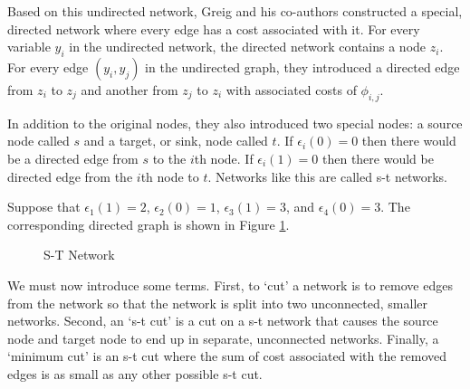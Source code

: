 Based on this undirected network, Greig and his co-authors constructed
a special, directed network where every edge has a cost associated
with it. For every variable $y_i$ in the undirected network, the
directed network contains a node $z_i$.  For every edge $(y_i, y_j)$ in the
undirected graph, they introduced a directed edge from $z_i$ to $z_j$ and
another from $z_j$ to $z_i$ with associated costs of $\phi_{i,j}$.

In addition to the original nodes, they also introduced two special
nodes: a source node called $s$ and a target, or sink, node called
$t$. If $\epsilon_i(0) = 0$ then there would be a directed edge from
$s$ to the $i$th node. If $\epsilon_i(1) = 0$ then there would be
directed edge from the $i$th node to $t$. Networks like this are
called s-t networks.

Suppose that $\epsilon_1(1)=2$, $\epsilon_2(0)=1$, $\epsilon_3(1)=3$,
and $\epsilon_4(0)=3$. The corresponding directed graph is shown in
Figure \ref{fig:directed}. 

\begin{figure}[!h]
\centering

\caption{S-T Network}
\label{fig:directed}
\end{figure}

We must now introduce some terms. First, to `cut' a network is to
remove edges from the network so that the network is split into two
unconnected, smaller networks. Second, an `s-t cut' is a cut on a s-t
network that causes the source node and target node to end up in
separate, unconnected networks. Finally, a `minimum cut' is an s-t cut
where the sum of cost associated with the removed edges is as small as
any other possible s-t cut. 

